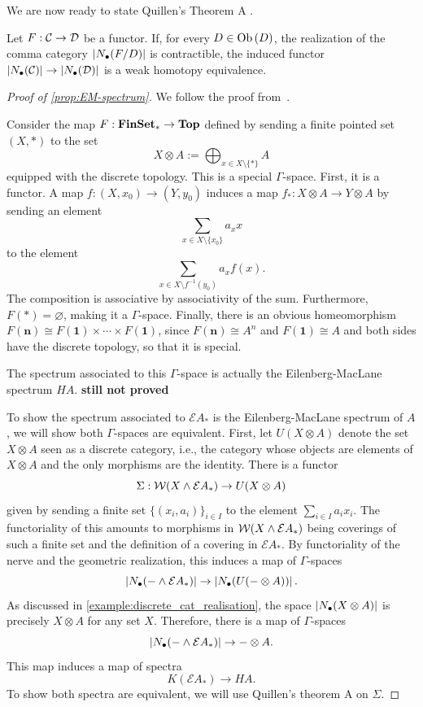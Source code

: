 We are now ready to state Quillen's Theorem A \cite{quillen_higher_1973}.

\begin{theorem}
    Let $F : \mathcal{C} \to \mathcal{D}$ be a functor. If, for every $D \in \operatorname{Ob}{\lparen D \rparen}$, the realization of the comma category $\left| N_{\bullet}(F/D) \right|$ is contractible, the induced functor $\left| N_{\bullet}(\mathcal{C}) \right| \to \left| N_{\bullet}(\mathcal{D}) \right|$ is a weak homotopy equivalence.
\end{theorem}

\begin{proof}[Proof of \cref{prop:EM-spectrum}]
    We follow the proof from~\cite[Lemma~7.1]{bohmann_trace_2024}.

    Consider the map $F : \textbf{FinSet}_* \to \textbf{Top}$ defined by sending a finite pointed set $(X,*)$ to the set 
    \[ X \otimes A := \bigoplus_{x \in X \setminus \{*\}} A \]
    equipped with the discrete topology. This is a special $\Gamma$-space. First, it is a functor. A map $f : (X,x_0) \to (Y,y_0)$ induces a map $f_* : X \otimes A \to Y \otimes A$ by sending an element 
    \[\sum_{x \in X \setminus \{x_0\}} a_x x\]
    to the element 
    \[\sum_{x \in X \setminus f^{-1}(y_0)} a_x f(x).\]
    The composition is associative by associativity of the sum. Furthermore, $F(*) = \varnothing$, making it a $\Gamma$-space. Finally, there is an obvious homeomorphism $F(\textbf{n}) \cong F(\textbf{1}) \times \cdots \times F(\textbf{1})$, since $F(\textbf{n}) \cong A^n$ and $F(\textbf{1}) \cong A$ and both sides have the discrete topology, so that it is special.

    The spectrum associated to this $\Gamma$-space is actually the Eilenberg-MacLane spectrum $HA$. \textbf{still not proved}

    To show the spectrum associated to $\mathcal{E} A_*$ is the Eilenberg-MacLane spectrum of $A$, we will show both $\Gamma$-spaces are equivalent. First, let $U(X \otimes A)$ denote the set $X \otimes A$ seen as a discrete category, i.e., the category whose objects are elements of $X \otimes A$ and the only morphisms are the identity. There is a functor
    \[ \Sigma : \mathcal{W}\lparen X \wedge \mathcal{E} A_* \rparen \to U(X \otimes A) \]
    given by sending a finite set $\{(x_i, a_i)\}_{i \in I}$ to the element $\sum_{i \in I} a_i x_i$. The functoriality of this amounts to morphisms in $\mathcal{W}\lparen X \wedge \mathcal{E} A_* \rparen$ being coverings of such a finite set and the definition of a covering in $\mathcal{E} A_*$. By functoriality of the nerve and the geometric realization, this induces a map of $\Gamma$-spaces
    \[ \left| N_{\bullet}(- \wedge \mathcal{E} A_*) \right| \to \left| N_{\bullet}(U(- \otimes A)) \right|.\]
    As discussed in \cref{example:discrete_cat_realisation}, the space $\left| N_{\bullet}(X \otimes A) \right|$ is precisely $X \otimes A$ for any set $X$. Therefore, there is a map of $\Gamma$-spaces
    \[ \left| N_{\bullet}(- \wedge \mathcal{E} A_*) \right| \to - \otimes A. \]
    This map induces a map of spectra
    \[ K(\mathcal{E} A_*) \to HA. \]
    To show both spectra are equivalent, we will use Quillen's theorem A on $\Sigma$. 
    

\end{proof}
